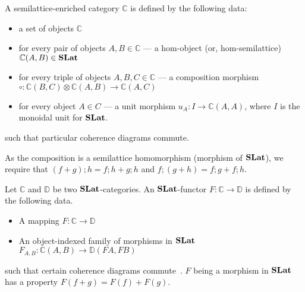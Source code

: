 \begin{definition}
\label{def:slat-cat}
    A semilattice-enriched category $\mathbb{C}$ is defined by the following data:
    \begin{itemize}
        \item a set of objects $\mathbb{C}$
        \item for every pair of objects $A,B \in \mathbb{C}$ --- a hom-object (or, hom-semilattice) $\mathbb{C}(A,B) \in \mathbf{SLat}$
        \item for every triple of objects $A,B,C \in \mathbb{C}$ --- a composition morphism 
        $\circ: \mathbb{C}(B,C) \otimes \mathbb{C}(A,B) \to \mathbb{C}(A,C)$
        \item for every object $A \in C$ --- a unit morphism 
        $u_{A} : I \to \mathbb{C}(A,A)$, where $I$ is the monoidal unit for $\mathbf{SLat}$.
    \end{itemize}
    such that particular coherence diagrams commute.
\end{definition}
As the composition is a semilattice homomorphism (morphism of $\mathbf{SLat}$), we require that 
$
(f + g); h = f;h + g;h$ and $f;(g+h) = f;g + f;h
$.

\begin{definition}
	Let $\mathbb{C}$ and $\mathbb{D}$ be two $\mathbf{SLat}$-categories.
	An $\mathbf{SLat}$-functor $F : \mathbb{C} \to \mathbb{D}$ is defined by the following data.
	\begin{itemize}
	  \item A mapping $F : \mathbb{C} \to \mathbb{D}$
	  \item An object-indexed family of morphisms in $\mathbf{SLat}$ $F_{A,B} : \mathbb{C}(A,B) \to \mathbb{D}(FA,FB)$
	\end{itemize}
	such that certain coherence diagrams commute~\cite{Borceux_1994}.
	$F$ being a morphism in $\mathbf{SLat}$ has a property $F(f + g) = F(f) + F(g)$.
\end{definition}


